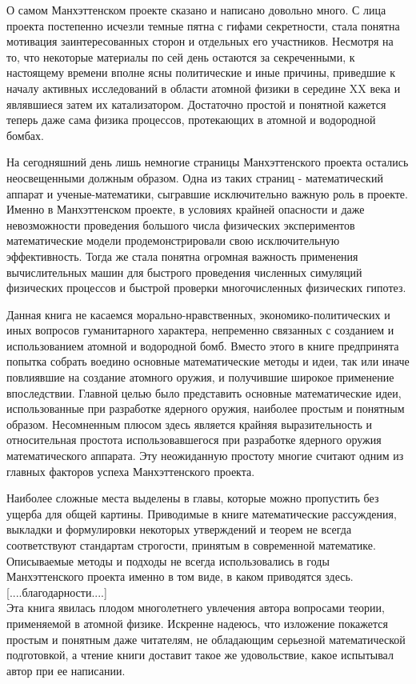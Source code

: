 О самом Манхэттенском проекте сказано и написано довольно много.
С лица проекта постепенно исчезли темные пятна с гифами секретности, стала понятна мотивация заинтересованных сторон и отдельных его участников.
Несмотря на то, что некоторые материалы по сей день остаются за секреченными, к настоящему времени вполне ясны политические и иные причины, приведшие к началу активных исследований в области атомной физики в середине XX века и являвшиеся затем их катализатором.
Достаточно простой и понятной кажется теперь даже сама физика процессов, протекающих в атомной и водородной бомбах.

На сегодняшний день лишь немногие страницы Манхэттенского проекта остались неосвещенными должным образом. 
Одна из таких страниц - математический аппарат и ученые-математики, сыгравшие исключительно важную роль в проекте.
Именно в Манхэттенском проекте, в условиях крайней опасности и даже невозможности проведения большого числа физических экспериментов математические модели продемонстрировали свою исключительную эффективность.
Тогда же стала понятна огромная важность применения вычислительных машин для быстрого проведения численных симуляций физических процессов и быстрой проверки многочисленных физических гипотез.

Данная книга не касаемся морально-нравственных, экономико-политических и иных вопросов гуманитарного характера, непременно связанных с созданием и использованием атомной и водородной бомб.
Вместо этого в книге предпринята попытка собрать воедино основные математические методы и идеи, так или иначе повлиявшие на создание атомного оружия, и получившие широкое применение впоследствии.
Главной целью было представить основные математические идеи, использованные при разработке ядерного оружия, наиболее простым и понятным образом. 
Несомненным плюсом здесь является крайняя выразительность и относительная простота использовавшегося при разработке ядерного оружия математического аппарата. 
Эту неожиданную простоту многие считают одним из главных факторов успеха Манхэттенского проекта.

Наиболее сложные места выделены в главы, которые можно пропустить без ущерба для общей картины.
Приводимые в книге математические рассуждения, выкладки и формулировки некоторых утверждений и теорем не всегда соответствуют стандартам строгости, принятым в современной математике.
Описываемые методы и подходы не всегда использовались в годы Манхэттенского проекта именно в том виде, в каком приводятся здесь.
\\

[....благодарности....]
\\

Эта книга явилась плодом многолетнего увлечения автора вопросами теории, применяемой в атомной физике. 
Искренне надеюсь, что изложение покажется простым и понятным даже читателям, не обладающим серьезной математической подготовкой, а чтение книги доставит такое же удовольствие, какое испытывал автор при ее написании.

